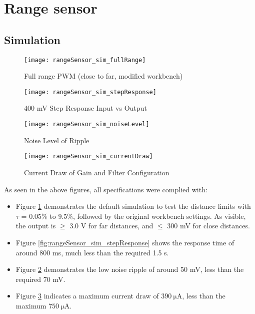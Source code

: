 \graphicspath{{content/3_results/figures}}
\section{Range sensor}\label{sec:range_sensor_results}

\subsection{Simulation}

\begin{figure}[!htb]
    \centering
    \texttt{[image: rangeSensor\_sim\_fullRange]}
    \caption{Full range PWM (close to far, modified workbench)}
    \label{fig:rangeSensor_sim_fullRange}
\end{figure}

\begin{figure}[!h]
    \centering
    \begin{minipage}{0.45\textwidth}
        \centering
        \texttt{[image: rangeSensor\_sim\_stepResponse]}
        \caption{400 mV Step Response Input vs Output}
        \label{fig:rangeSensor_sim_stepResponse}
    \end{minipage}
    \begin{minipage}{0.45\textwidth}
        \centering
        \texttt{[image: rangeSensor\_sim\_noiseLevel]}
        \caption{Noise Level of Ripple}
        \label{fig:rangeSensor_sim_noiseLevel}
    \end{minipage}
\end{figure}

\begin{figure}[!htb]
    \centering
    \texttt{[image: rangeSensor\_sim\_currentDraw]}
    \caption{Current Draw of Gain and Filter Configuration}
    \label{fig:rangeSensor_sim_currentDraw}
\end{figure}

As seen in the above figures, all specifications were complied with:
\begin{itemize}
    \item Figure \ref{fig:rangeSensor_sim_fullRange} demonstrates the default simulation to test the distance limits with $\tau$ = 0.05\% to 9.5\%,
          followed by the original workbench settings. As visible, the output is $\geq$ 3.0 V for far distances, and $\leq$ 300 mV for close distances.
    \item Figure \ref{fig:rangeSensor_sim_stepResponse} shows the response time of around 800 ms, much less than the required 1.5 s.
    \item Figure \ref{fig:rangeSensor_sim_noiseLevel} demonstrates the low noise ripple of around 50 mV, less than the required 70 mV.
    \item Figure \ref{fig:rangeSensor_sim_currentDraw} indicates a maximum current draw of $\SI{390}{\micro\ampere}$, less than the maximum $\SI{750}{\micro\ampere}$.

\end{itemize}

